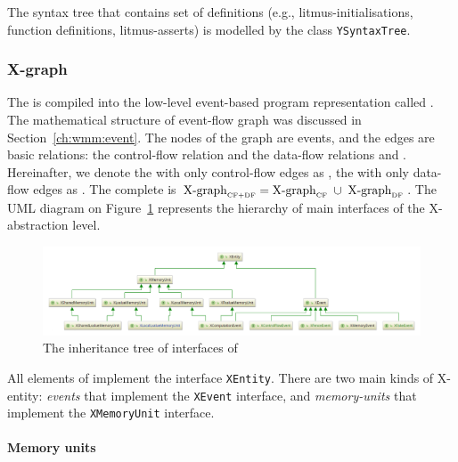 The syntax tree that contains set of definitions (e.g., litmus-initialisations, function definitions, litmus-asserts) is modelled by the class \texttt{YSyntaxTree}.


\subsubsection{X-graph}
\label{ch:impl:model:xgraph}

The \ytree{} is compiled into the low-level event-based program representation called \textit{\xgraph{}}.
The mathematical structure of event-flow graph was discussed in Section~\ref{ch:wmm:event}.
The nodes of the graph are events, and the edges are basic relations: the control-flow relation \po and the data-flow relations \co and \rf.
Hereinafter, we denote the \xgraph{} with only control-flow edges as \xgraph[CF], the \xgraph{} with only data-flow edges as \xgraph[CF].
The complete \xgraph{} is $\xgraph[CF+DF] = \xgraph[CF] \; \cup \; \xgraph[DF]$.
The UML diagram on Figure~\ref{fig:class-diagrams:XEntity-interfaces} represents the hierarchy of main interfaces of the X-abstraction level.


\begin{figure}[t]%
  \centering
  \includegraphics[width=\textwidth,keepaspectratio]{img/my/class-diagrams/XEntity-interfaces.png}
  \caption{The inheritance tree of interfaces of \xgraph{}}
  \label{fig:class-diagrams:XEntity-interfaces}
\end{figure}

All elements of \xgraph{} implement the interface \texttt{XEntity}.
There are two main kinds of X-entity: \textit{events} that implement the \texttt{XEvent} interface, and \textit{memory-units} that implement the \texttt{XMemoryUnit} interface.


\paragraph{Memory units}
\label{ch:impl:model:xgraph:mem}

